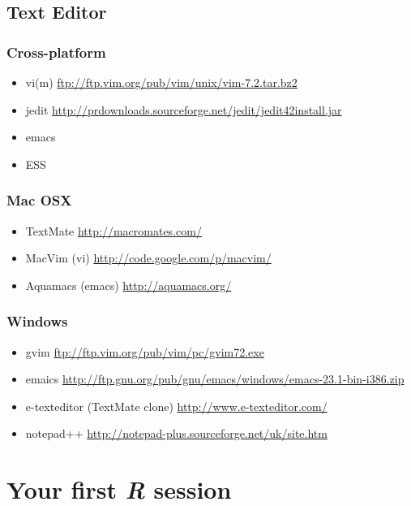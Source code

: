 \documentclass[10pt,letterpaper]{article}
\begin{document}
\subsection{Text Editor}

\subsubsection{Cross-platform} %
\label{ssub:cross_platform}
\begin{itemize}
    \item vi(m) \url{ftp://ftp.vim.org/pub/vim/unix/vim-7.2.tar.bz2}
    \item jedit \url{http://prdownloads.sourceforge.net/jedit/jedit42install.jar}
    \item emacs
    \item ESS
\end{itemize}



\subsubsection{Mac OSX} %
\label{ssub:mac_osx2}
\begin{itemize}
    \item TextMate \url{http://macromates.com/}
    \item MacVim (vi) \url{http://code.google.com/p/macvim/}
    \item Aquamacs (emacs) \url{http://aquamacs.org/}
\end{itemize}

\subsubsection{Windows} %
\label{ssub:windows2}
\begin{itemize}
    \item gvim \url{ftp://ftp.vim.org/pub/vim/pc/gvim72.exe}
    \item emaics \url{http://ftp.gnu.org/pub/gnu/emacs/windows/emacs-23.1-bin-i386.zip}
    \item e-texteditor (TextMate clone) \url{http://www.e-texteditor.com/}
    \item notepad++ \url{http://notepad-plus.sourceforge.net/uk/site.htm}
\end{itemize}

\section{Your first \emph{R} session}
\end{document}
